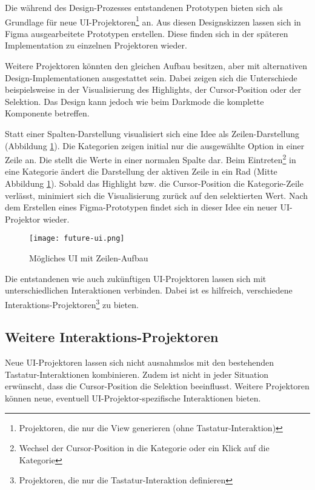 Die während des Design-Prozesses entstandenen Prototypen bieten sich als Grundlage für neue UI-Projektoren\footnote{
    Projektoren, die nur die View generieren (ohne Tastatur-Interaktion)
} an. 
Aus diesen Designskizzen lassen sich in Figma ausgearbeitete Prototypen erstellen. 
Diese finden sich in der späteren Implementation zu einzelnen Projektoren wieder. 

Weitere Projektoren könnten den gleichen Aufbau besitzen, aber mit alternativen Design-Implementationen ausgestattet sein. 
Dabei zeigen sich die Unterschiede beispielsweise in der Visualisierung des Highlights, der Cursor-Position oder der Selektion. 
Das Design kann jedoch wie beim Darkmode die komplette Komponente betreffen. 

Statt einer Spalten-Darstellung visualisiert sich eine Idee als Zeilen-Darstellung (Abbildung \ref{img:futureUi}). 
Die Kategorien zeigen initial nur die ausgewählte Option in einer Zeile an. 
Die  stellt die Werte in einer normalen Spalte dar. 
Beim Eintreten\footnote{
    Wechsel der Cursor-Position in die Kategorie oder ein Klick auf die Kategorie
} in eine Kategorie ändert die Darstellung der aktiven Zeile in ein Rad (Mitte Abbildung \ref{img:futureUi}). 
Sobald das Highlight bzw. die Cursor-Position die Kategorie-Zeile verlässt, minimiert sich die Visualisierung zurück auf den selektierten Wert. 
Nach dem Erstellen eines Figma-Prototypen findet sich in dieser Idee ein neuer UI-Projektor wieder. 

\begin{figure}[!htb]
    \centering
    \texttt{[image: future-ui.png]}
    \caption{\centering Mögliches UI mit Zeilen-Aufbau}
    \label{img:futureUi}
\end{figure}

Die entstandenen wie auch zukünftigen UI-Projektoren lassen sich mit unterschiedlichen Interaktionen verbinden. 
Dabei ist es hilfreich, verschiedene Interaktions-Pro\-jek\-toren\footnote{
    Projektoren, die nur die Tastatur-Interaktion definieren
} zu bieten. 


\subsection{Weitere Interaktions-Projektoren}
\label{sec:moreInteraction}

Neue UI-Projektoren lassen sich nicht ausnahmslos mit den bestehenden Tastatur-Inter\-aktionen kombinieren. 
Zudem ist nicht in jeder Situation erwünscht, dass die Cursor-Position die Selektion beeinflusst. 
Weitere Projektoren können neue, eventuell UI-Pro\-jektor-spezifische Interaktionen bieten. 

